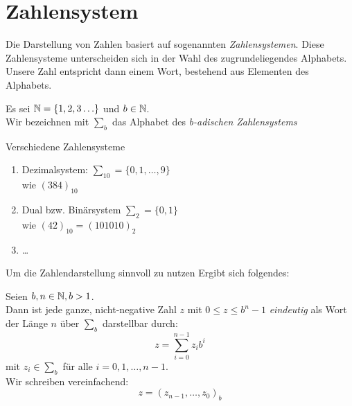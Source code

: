 \section{Zahlensystem}
Die Darstellung von Zahlen basiert auf sogenannten \emph{Zahlensystemen}.
Diese Zahlensysteme unterscheiden sich in der Wahl des zugrundeliegendes Alphabets.
Unsere Zahl entspricht dann einem Wort, bestehend aus Elementen des Alphabets.\\


\begin{definition}[Alphabet]
Es sei $\mathbb{N} = \{ 1,2,3\ldots \}$ und $b \in  \mathbb{N}$. \\
Wir bezeichnen mit $\sum_{b}$ das Alphabet des \emph{b-adischen Zahlensystems}
\end{definition}

\begin{example}
Verschiedene Zahlensysteme
\begin{enumerate}
	\item Dezimalsystem: $\sum_{10}= \{0,1,\ldots,9\}$ \\ wie $(384)_10$
	\item Dual bzw. Binärsystem $\sum_2 = \{0,1\}$ \\ wie $(42)_10 = (101010)_2$
	\item \ldots
\end{enumerate}
\end{example}
Um die Zahlendarstellung sinnvoll zu nutzen Ergibt sich folgendes:
\begin{theorem}[]
Seien $b,n \in  \mathbb{N}, b>1 $. \\
Dann ist jede ganze, nicht-negative Zahl $z$ mit $0\le z \le b^{n}-1$ \emph{eindeutig} als Wort der Länge $n$ über $\sum_b$ darstellbar durch:
\[
z=\sum_{i=0}^{n-1}z_ib^{i}
\]
mit $z_i \in \sum_b$ für alle $i=0,1,\ldots,n-1$. \\
Wir schreiben vereinfachend: 
\[
z=(z_{n-1},\ldots, z_0)_b
\]
\end{theorem}
